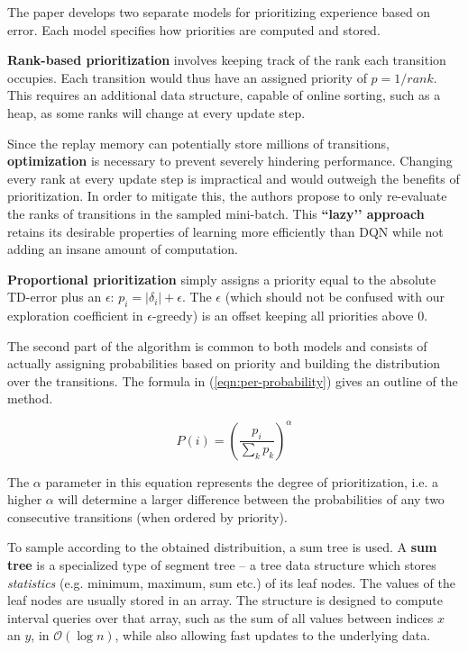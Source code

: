The paper develops two separate models for prioritizing experience based on error.
Each model specifies how priorities are computed and stored.

\textbf{Rank-based prioritization} involves keeping track of the rank each transition occupies.
Each transition would thus have an assigned priority of $p = 1 / rank$.
This requires an additional data structure, capable of online sorting, such as a heap, as some ranks will change at every update step.

Since the replay memory can potentially store millions of transitions, \textbf{optimization} is necessary to prevent severely hindering performance.
Changing every rank at every update step is impractical and would outweigh the benefits of prioritization.
In order to mitigate this, the authors propose to only re-evaluate the ranks of transitions in the sampled mini-batch.
This \textbf{``lazy’’ approach} retains its desirable properties of learning more efficiently than DQN while not adding an insane amount of computation.

\textbf{Proportional prioritization} simply assigns a priority equal to the absolute TD-error plus an $\epsilon$: $p_{i} = |\delta_{i}| + \epsilon$.
The $\epsilon$ (which should not be confused with our exploration coefficient in $\epsilon$-greedy) is an offset keeping all priorities above $0$.

The second part of the algorithm is common to both models and consists of actually assigning probabilities based on priority and building the distribution over the transitions. The formula in (\ref{eqn:per-probability}) gives an outline of the method.

\begin{equation} \label{eqn:per-probability}
    P(i) =  \left( \frac{p_i}{\sum_{k}{p_{k}}} \right)^\alpha
\end{equation}

The $\alpha$ parameter in this equation represents the degree of prioritization, i.e. a higher $\alpha$ will determine a larger difference between the probabilities of any two consecutive transitions (when ordered by priority).

To sample according to the obtained distribuition, a sum tree is used.
A \textbf{sum tree} is a specialized type of segment tree -- a tree data structure which stores \emph{statistics} (e.g. minimum, maximum, sum etc.) of its leaf nodes.
The values of the leaf nodes are usually stored in an array.
The structure is designed to compute interval queries over that array, such as the sum of all values between indices $x$ an $y$, in $\mathcal{O}(\log{n})$, while also allowing fast updates to the underlying data.

